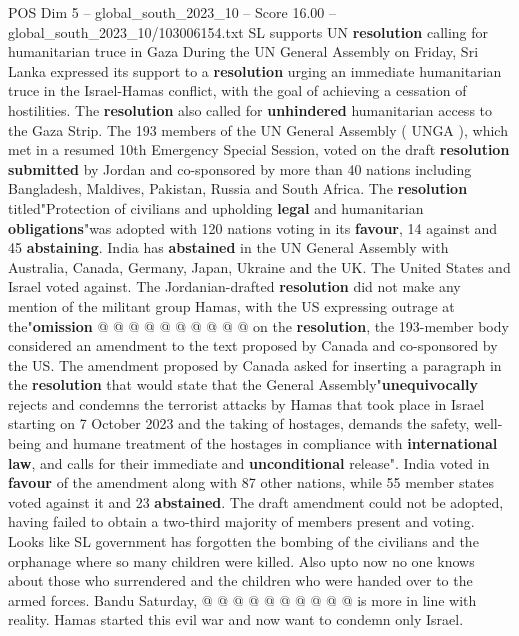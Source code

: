 \begin{textsample}{POS Dim 5 – global\_south\_2023\_10 – Score 16.00 – global\_south\_2023\_10/103006154.txt}  \label{ex:f5_pos_362}
SL supports UN \textbf{resolution} calling for humanitarian truce in Gaza During the UN General Assembly on Friday, Sri Lanka expressed its support to a \textbf{resolution} urging an immediate humanitarian truce in the Israel-Hamas conflict, with the goal of achieving a cessation of hostilities.
The \textbf{resolution} also called for \textbf{unhindered} humanitarian access to the Gaza Strip.
The 193 members of the UN General Assembly ( UNGA ), which met in a resumed 10th Emergency Special Session, voted on the draft \textbf{resolution} \textbf{submitted} by Jordan and co-sponsored by more than 40 nations including Bangladesh, Maldives, Pakistan, Russia and South Africa.
The \textbf{resolution} titled"Protection of civilians and upholding \textbf{legal} and humanitarian \textbf{obligations}"was adopted with 120 nations voting in its \textbf{favour}, 14 against and 45 \textbf{abstaining}.
India has \textbf{abstained} in the UN General Assembly with Australia, Canada, Germany, Japan, Ukraine and the UK.
The United States and Israel voted against.
The Jordanian-drafted \textbf{resolution} did not make any mention of the militant group Hamas, with the US expressing outrage at the"\textbf{omission} @ @ @ @ @ @ @ @ @ @ on the \textbf{resolution}, the 193-member body considered an amendment to the text proposed by Canada and co-sponsored by the US.
The amendment proposed by Canada asked for inserting a paragraph in the \textbf{resolution} that would state that the General Assembly"\textbf{unequivocally} rejects and condemns the terrorist attacks by Hamas that took place in Israel starting on 7 October 2023 and the taking of hostages, demands the safety, well-being and humane treatment of the hostages in compliance with \textbf{international} \textbf{law}, and calls for their immediate and \textbf{unconditional} release".
India voted in \textbf{favour} of the amendment along with 87 other nations, while 55 member states voted against it and 23 \textbf{abstained}.
The draft amendment could not be adopted, having failed to obtain a two-third majority of members present and voting.
Looks like SL government has forgotten the bombing of the civilians and the orphanage where so many children were killed.
Also upto now no one knows about those who surrendered and the children who were handed over to the armed forces.
Bandu Saturday, @ @ @ @ @ @ @ @ @ @ is more in line with reality.
Hamas started this evil war and now want to condemn only Israel.

\end{textsample}

